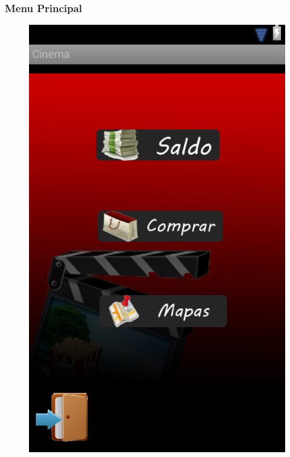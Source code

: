\documentclass{beamer}
\begin{document}
\begin{frame}[allowframbreaks]
\frametitle{Menu Principal}
\begin{figure}[h]
\centering
\includegraphics[height=0.8\textheight]{menuprincipal.png}
\end{figure}
\end{frame}
\end{document}
